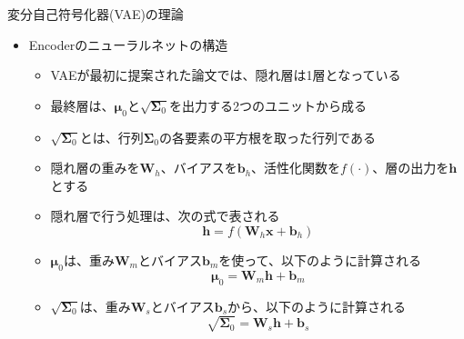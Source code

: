 \documentclass[dvipdfmx,notheorems,t]{beamer}
\begin{document}
\begin{frame}{変分自己符号化器(VAE)の理論}
	
\begin{itemize}
	\item Encoderのニューラルネットの構造
	\begin{itemize}
		\item VAEが最初に提案された論文では、隠れ層は1層となっている
		\item 最終層は、$\bm{\mu}_0$と$\sqrt{\bm{\Sigma}_0}$を出力する2つのユニットから成る
		\item $\sqrt{\bm{\Sigma}_0}$とは、行列$\bm{\Sigma}_0$の各要素の平方根を取った行列である
		\newline
		
		\item 隠れ層の重みを$\bm{W}_h$、バイアスを$\bm{b}_h$、活性化関数を$f(\cdot)$、層の出力を$\bm{h}$とする
		\item 隠れ層で行う処理は、次の式で表される
		\begin{equation}
			\bm{h} = f(\bm{W}_h \bm{x} + \bm{b}_h)
		\end{equation}
		
		\item $\bm{\mu}_0$は、重み$\bm{W}_m$とバイアス$\bm{b}_m$を使って、以下のように計算される
		\begin{equation}
			\bm{\mu}_0 = \bm{W}_m \bm{h} + \bm{b}_m
		\end{equation}
		
		\item $\sqrt{\bm{\Sigma}_0}$は、重み$\bm{W}_s$とバイアス$\bm{b}_s$から、以下のように計算される
		\begin{equation}
			\sqrt{\bm{\Sigma}_0} = \bm{W}_s \bm{h} + \bm{b}_s
		\end{equation}
	\end{itemize}
\end{itemize}

\end{frame}
\end{document}
